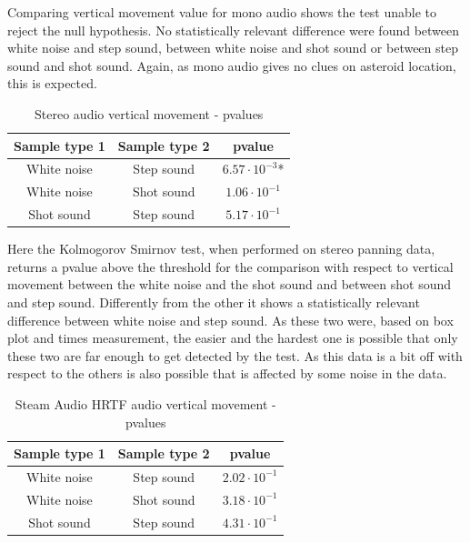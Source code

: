 \documentclass[conference]{IEEEtran}
\begin{document}
Comparing vertical movement value for mono audio shows the test unable to reject the null hypothesis. No statistically relevant difference were found between white noise and step sound, between white noise and shot sound or between step sound and shot sound. Again, as mono audio gives no clues on asteroid location, this is expected.

\begin{table}[htbp]
\caption{Stereo audio vertical movement - pvalues}
\begin{center}
\begin{tabular}{|c|c|c|}
\hline
\textbf{Sample type 1} & \textbf{Sample type 2} & \textbf{pvalue}\\
\hline
White noise & Step sound & $6.57 \cdot 10^{-3}$*\\
\hline
White noise & Shot sound & $1.06 \cdot 10^{-1}$\\
\hline
Shot sound & Step sound & $5.17 \cdot 10^{-1}$\\
\hline
\end{tabular}
\label{tab62}
\end{center}
\end{table}

Here the Kolmogorov Smirnov test, when performed on stereo panning data, returns a pvalue above the threshold for the comparison with respect to vertical movement between the white noise and the shot sound and between shot sound and step sound. Differently from the other it shows a statistically relevant difference between white noise and step sound. As these two were, based on box plot and times measurement, the easier and the hardest one is possible that only these two are far enough to get detected by the test. As this data is a bit off with respect to the others is also possible that is affected by some noise in the data.

\begin{table}[htbp]
\caption{Steam Audio HRTF audio vertical movement - pvalues}
\begin{center}
\begin{tabular}{|c|c|c|}
\hline
\textbf{Sample type 1} & \textbf{Sample type 2} & \textbf{pvalue}\\
\hline
White noise & Step sound & $2.02 \cdot 10^{-1}$\\
\hline
White noise & Shot sound & $3.18 \cdot 10^{-1}$\\
\hline
Shot sound & Step sound & $4.31 \cdot 10^{-1}$\\
\hline
\end{tabular}
\label{tab72}
\end{center}
\end{table}
\end{document}
